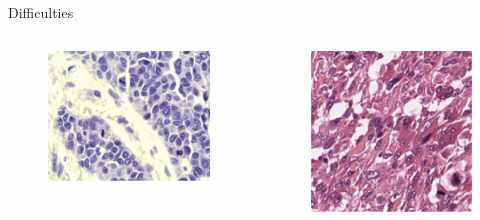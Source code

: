 \documentclass{beamer}
\begin{document}
\begin{frame}{Difficulties}
\begin{columns}[T] %
\begin{column}{.3\textwidth}
\begin{figure}[!ht]
\centering
\includegraphics[width=\textwidth]{histo1.png}
\label{}
\end{figure}
\end{column}%
\hfill%
\begin{column}{.3\textwidth}
\begin{figure}[!ht]
\centering
\includegraphics[width=\textwidth]{histo2.png}

\end{figure}
\end{column}
\end{columns}
\end{frame}
\end{document}
